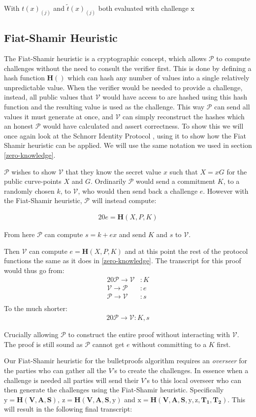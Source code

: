 \documentclass{article}
\newcommand{\eq}[1]{\begin{alignat*}{20}#1\end{alignat*}}
\renewcommand{\vec}[1]{\boldsymbol{#1}}
\newcommand{\ran}[1]{\mathrm{#1}}
\newcommand{\V}{\mathcal{V}}
\renewcommand{\P}{\mathcal{P}}
\newcommand{\blind}[1]{\widetilde{#1}}
\newcommand{\bt}{\blind{t}}
\begin{document}
With $t(x)_{(j)}$ and $\bt(x)_{(j)}$ both evaluated with challenge $\ran{x}$

\subsection{Fiat-Shamir Heuristic}\label{fiat-shamir-heuristic}

The Fiat-Shamir heuristic \cite{zkdocs-fiat-shamir} is a cryptographic concept, which allows
$\P$ to compute challenges without the need to consult the verifier
first. This is done by defining a hash function $\textbf{H}()$ which
can hash any number of values into a single relatively unpredictable
value. When the verifier would be needed to provide a challenge,
instead, all public values that $\V$ would have access to are
hashed using this hash function and the resulting value is used as
the challenge. This way $\P$ can send all values it must generate at
once, and $\V$ can simply reconstruct the hashes which an honest $\P$
would have calculated and assert correctness. To show this we will
once again look at the Schnorr Identity Protocol \cite{zkdocs-schnorr}, using it to show
how the Fiat Shamir heuristic can be applied. We will use the same
notation we used in section \ref{zero-knowledge}.

$\P$ wishes to show $\V$ that they know the secret value $x$ such that
$X = xG$ for the public curve-points $X$ and $G$. Ordinarily $\P$ would
send a commitment $K$, to a randomly chosen $k$, to $\V$, who would
then send back a challenge $e$. However with the Fiat-Shamir heuristic,
$\P$ will instead compute:

\eq{
	e = \textbf{H}(X,P,K)
}

From here $\P$ can compute $s = k + ex$ and send $K$ and $s$ to $\V$.

Then $\V$ can compute $e = \textbf{H}(X,P,K)$ and at this
point the rest of the protocol functions the same as it does in
\ref{zero-knowledge}. The transcript for this proof would thus go from:
\eq{
	\P \rightarrow \V &: K \\
	\V \rightarrow \P &: e \\
	\P \rightarrow \V &: s \\
}
To the much shorter:
\eq{
	\P \rightarrow \V: K, s
}

Crucially allowing $\P$ to construct the entire proof without
interacting with $\V$. The proof is still sound as $\P$ cannot get $e$
without committing to a $K$ first.

Our Fiat-Shamir heuristic for the bulletproofs algorithm requires
an \textit{overseer} for the parties who can gather all the $V$'s
to create the challenges. In essence when a challenge is needed all
parties will send their $V$'s to this local overseer who can then
generate the challenges using the Fiat-Shamir heuristic. Specifically
$\ran{y} = \textbf{H}(\vec{V},\vec{A},\vec{S}), \ \ran{z} =
\textbf{H}(\vec{V},\vec{A},\vec{S}, \ran{y})$ and $\ran{x}
= \textbf{H}(\vec{V},\vec{A},\vec{S}, \ran{y}, \ran{z},
\vec{T_1},\vec{T_2})$. This will result in the following final
transcript:
\end{document}
